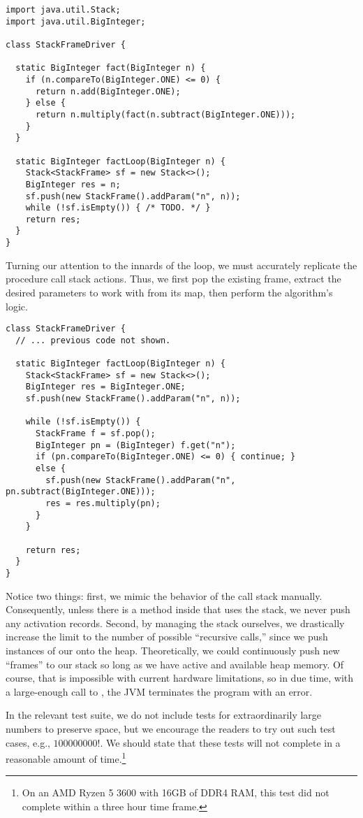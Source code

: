 \begin{lstlisting}[language=MyJava]
import java.util.Stack;
import java.util.BigInteger;

class StackFrameDriver {

  static BigInteger fact(BigInteger n) {
    if (n.compareTo(BigInteger.ONE) <= 0) {
      return n.add(BigInteger.ONE);
    } else {
      return n.multiply(fact(n.subtract(BigInteger.ONE)));
    }
  }

  static BigInteger factLoop(BigInteger n) {
    Stack<StackFrame> sf = new Stack<>();
    BigInteger res = n;
    sf.push(new StackFrame().addParam("n", n));
    while (!sf.isEmpty()) { /* TODO. */ }
    return res;
  }
}
\end{lstlisting}

Turning our attention to the innards of the loop, we must accurately replicate the procedure call stack actions. 
Thus, we first pop the existing frame, extract the desired parameters to work with from its map, then perform the algorithm's logic.

\begin{lstlisting}[language=MyJava]
class StackFrameDriver {
  // ... previous code not shown.

  static BigInteger factLoop(BigInteger n) {
    Stack<StackFrame> sf = new Stack<>();
    BigInteger res = BigInteger.ONE;
    sf.push(new StackFrame().addParam("n", n));

    while (!sf.isEmpty()) {
      StackFrame f = sf.pop();
      BigInteger pn = (BigInteger) f.get("n");
      if (pn.compareTo(BigInteger.ONE) <= 0) { continue; }
      else {
        sf.push(new StackFrame().addParam("n", pn.subtract(BigInteger.ONE)));
        res = res.multiply(pn);
      }
    }

    return res;
  }
}
\end{lstlisting}

Notice two things: first, we mimic the behavior of the call stack manually. 
Consequently, unless there is a method inside that uses the stack, we never push any activation records. 
Second, by managing the stack ourselves, we drastically increase the limit to the number of possible ``recursive calls,'' since we push instances of our  onto the heap. 
Theoretically, we could continuously push new ``frames'' to our stack so long as we have active and available heap memory. 
Of course, that is impossible with current hardware limitations, so in due time, with a large-enough call to , the JVM terminates the program with an  error. 

In the relevant test suite, we do not include tests for extraordinarily large numbers to preserve space, but we encourage the readers to try out such test cases, e.g., $100000000!$. 
We should state that these tests will not complete in a reasonable amount of time.\footnote{On an AMD Ryzen 5 3600 with 16GB of DDR4 RAM, this test did not complete within a three hour time frame.} 